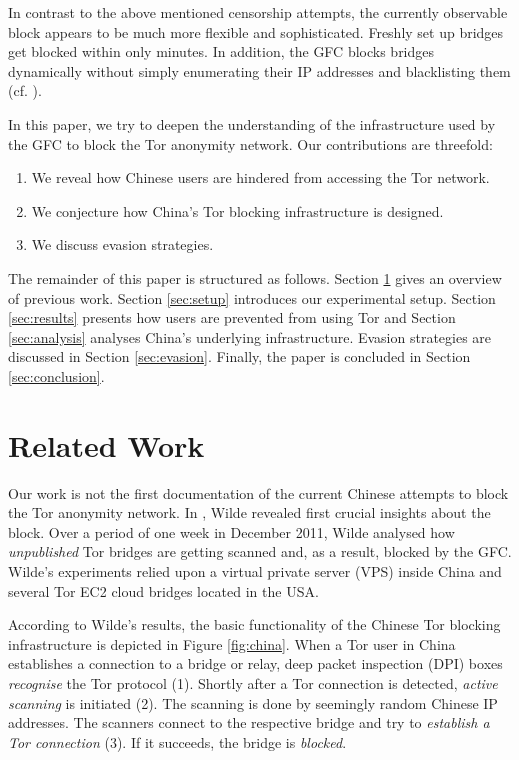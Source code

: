 \documentclass[runningheads,a4paper]{llncs}
\begin{document}
In contrast to the above mentioned censorship attempts, the currently observable block appears to be
much more flexible and sophisticated. Freshly set up bridges get blocked within only minutes. In
addition, the GFC blocks bridges dynamically without simply enumerating their IP addresses and
blacklisting them (cf. \cite{Ling2012}).

In this paper, we try to deepen the understanding of the infrastructure used by the GFC to block the
Tor anonymity network. Our contributions are threefold:
\begin{enumerate}
	\item We reveal how Chinese users are hindered from accessing the Tor network.
	\item We conjecture how China's Tor blocking infrastructure is designed.
	\item We discuss evasion strategies.
\end{enumerate}

The remainder of this paper is structured as follows. Section \ref{sec:related} gives an overview of
previous work. Section \ref{sec:setup} introduces our experimental setup. Section \ref{sec:results}
presents how users are prevented from using Tor and Section \ref{sec:analysis} analyses China's
underlying infrastructure. Evasion strategies are discussed in Section \ref{sec:evasion}. Finally,
the paper is concluded in Section \ref{sec:conclusion}.


\section{Related Work}
\label{sec:related}
Our work is not the first documentation of the current Chinese attempts to block the Tor anonymity
network. In \cite{twilde}, Wilde revealed first crucial insights about the block. Over a period of
one week in December 2011, Wilde analysed how \emph{unpublished} Tor bridges are getting scanned
and, as a result, blocked by the GFC. Wilde's experiments relied upon a virtual private server (VPS)
inside China and several Tor EC2 cloud bridges \cite{ec2,TorCloud} located in the USA.

According to Wilde's results, the basic functionality of the Chinese Tor blocking infrastructure is
depicted in Figure \ref{fig:china}. When a Tor user in China establishes a connection to a bridge or
relay, deep packet inspection (DPI) boxes \emph{recognise} the Tor protocol (1). Shortly after a Tor
connection is detected, \emph{active scanning} is initiated (2). The scanning is done by seemingly
random Chinese IP addresses. The scanners connect to the respective bridge and try to
\emph{establish a Tor connection} (3). If it succeeds, the bridge is \emph{blocked}.
\end{document}
